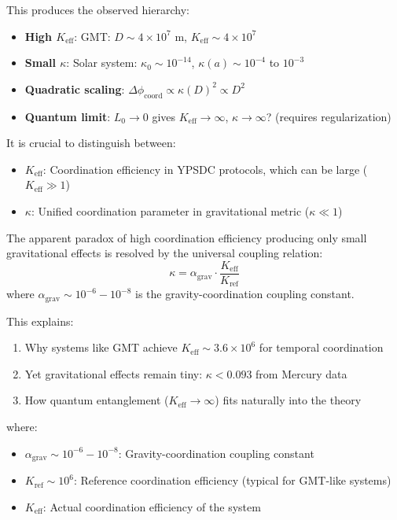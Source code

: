 \documentclass[11pt,a4paper]{article}
\begin{document}
This produces the observed hierarchy:
\begin{itemize}
	\item \textbf{High $K_{\mathrm{eff}}$}: GMT: $D \sim 4\times10^7$ m, $K_{\mathrm{eff}} \sim 4\times10^7$
	\item \textbf{Small $\kappa$}: Solar system: $\kappa_0 \sim 10^{-14}$, $\kappa(a) \sim 10^{-4}$ to $10^{-3}$
	\item \textbf{Quadratic scaling}: $\Delta\phi_{\text{coord}} \propto \kappa(D)^2 \propto D^2$
	\item \textbf{Quantum limit}: $L_0 \to 0$ gives $K_{\mathrm{eff}} \to \infty$, $\kappa \to \infty$? (requires regularization)
\end{itemize}

It is crucial to distinguish between:
\begin{itemize}
	\item \textbf{$K_{\mathrm{eff}}$}: Coordination efficiency in YPSDC protocols, which can be large ($K_{\mathrm{eff}} \gg 1$)
	\item \textbf{$\kappa$}: Unified coordination parameter in gravitational metric ($\kappa \ll 1$)
\end{itemize}

The apparent paradox of high coordination efficiency producing only small gravitational effects is resolved by the universal coupling relation:
\begin{equation}
	\boxed{\kappa = \alpha_{\text{grav}} \cdot \frac{K_{\mathrm{eff}}}{K_{\text{ref}}}}
\end{equation}
where $\alpha_{\text{grav}} \sim 10^{-6} - 10^{-8}$ is the gravity-coordination coupling constant.

This explains:
\begin{enumerate}
	\item Why systems like GMT achieve $K_{\mathrm{eff}} \sim 3.6\times10^6$ for temporal coordination
	\item Yet gravitational effects remain tiny: $\kappa < 0.093$ from Mercury data
	\item How quantum entanglement ($K_{\mathrm{eff}} \to \infty$) fits naturally into the theory
\end{enumerate}
where:
\begin{itemize}
	\item $\alpha_{\text{grav}} \sim 10^{-6} - 10^{-8}$: Gravity-coordination coupling constant
	\item $K_{\text{ref}} \sim 10^6$: Reference coordination efficiency (typical for GMT-like systems)
	\item $K_{\mathrm{eff}}$: Actual coordination efficiency of the system
\end{itemize}
\end{document}
